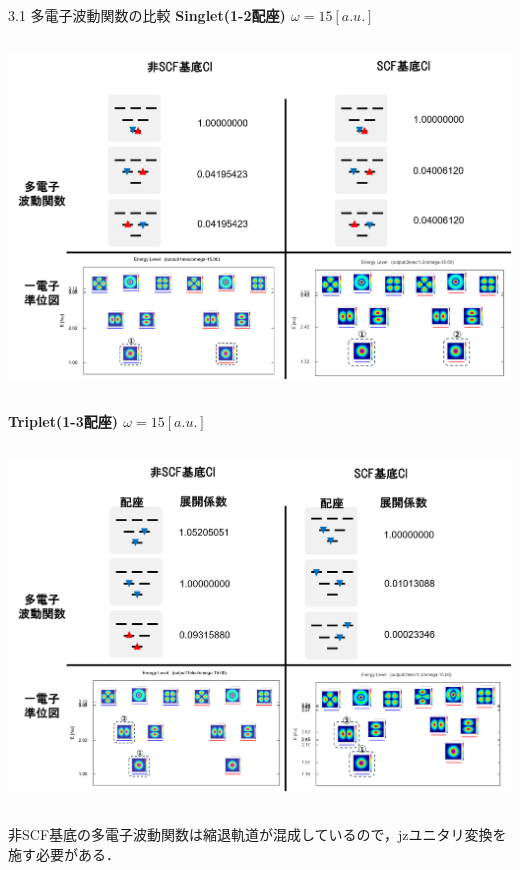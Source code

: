 \documentclass{beamer}
\begin{document}
\begin{frame}{3.1 多電子波動関数の比較}
  \textbf{Singlet(1-2配座) $\omega=15[a.u.]$}
  \begin{columns}
  \begin{center}
      \includegraphics[width=1.0\linewidth]{imeges/1-2/波動関数.png}
  \end{center}
\end{columns}
\end{frame}  

\begin{frame}{}
  \textbf{Triplet(1-3配座) $\omega=15[a.u.]$}
  \begin{columns}
  \begin{center}
      \includegraphics[width=1.0\linewidth]{imeges/1-3/波動関数.png}
  \end{center}
\end{columns}
非SCF基底の多電子波動関数は縮退軌道が混成しているので，jzユニタリ変換を施す必要がある．
\end{frame}  
\end{document}
